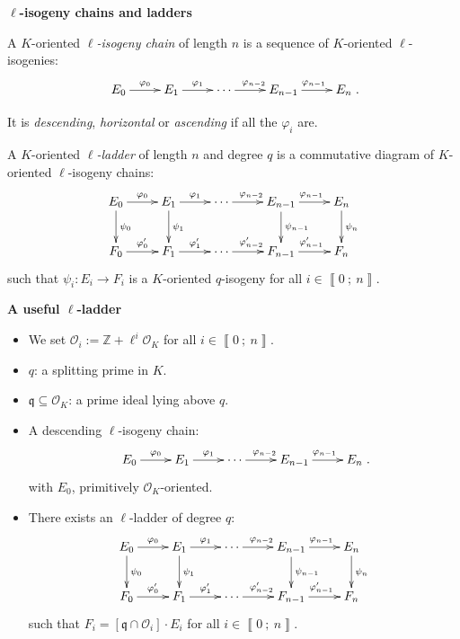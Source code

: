 \documentclass[10pt]{beamer}
\theoremstyle{plain}
\theoremstyle{definition}
\newcommand{\Z}{\mathbb{Z}}
\newcommand{\mO}{\mathcal{O}}
\renewcommand{\i}[2]{\left\llbracket #1~;~#2\right\rrbracket}
\renewcommand{\(}{\left(}
\renewcommand{\)}{\right)}
\newcommand{\mf}[1]{\mathfrak{#1}}
\begin{document}
\begin{frame}

\textbf{$\ell$-isogeny chains and ladders}

\begin{definition}
A $K$-oriented \emph{$\ell$-isogeny chain} of length $n$ is a sequence of $K$-oriented $\ell$-isogenies:
\[\xymatrix{
E_0 \ar[r]^{\varphi_0} & E_1 \ar[r]^{\varphi_{1}}& \cdots \ar[r]^{\varphi_{n-2}} & E_{n-1} \ar[r]^{\varphi_{n-1}} & E_n
}.\]

It is \emph{descending}, \emph{horizontal} or \emph{ascending} if all the $\varphi_i$ are.

\pause

A $K$-oriented \emph{$\ell$-ladder} of length $n$ and degree $q$ is a commutative diagram of $K$-oriented $\ell$-isogeny chains:
\[\xymatrix{
E_0 \ar[d]^{\psi_0} \ar[r]^{\varphi_0} & E_1\ar[d]^{\psi_1} \ar[r]^{\varphi_{1}}& \cdots \ar[r]^{\varphi_{n-2}} & E_{n-1} \ar[d]^{\psi_{n-1}} \ar[r]^{\varphi_{n-1}} & E_n \ar[d]^{\psi_n}\\
F_0 \ar[r]^{\varphi'_0} & F_1 \ar[r]^{\varphi'_{1}}& \cdots \ar[r]^{\varphi'_{n-2}} & F_{n-1} \ar[r]^{\varphi'_{n-1}} & F_n
}\]
such that $\psi_i : E_i\longrightarrow F_i$ is a $K$-oriented $q$-isogeny for all $i\in\i{0}{n}$.
\end{definition}

\end{frame}

\begin{frame}
\textbf{A useful $\ell$-ladder}

\vspace{0.5cm}

\begin{itemize}
\item We set $\mO_i:=\Z+\ell^i\mO_K$ for all $i\in\i{0}{n}$.
\item $q$: a splitting prime in $K$.
\item $\mf{q}\subseteq \mO_K$: a prime ideal lying above $q$. 
\item A descending $\ell$-isogeny chain:
\[\xymatrix{
E_0 \ar[r]^{\varphi_0} & E_1 \ar[r]^{\varphi_{1}}& \cdots \ar[r]^{\varphi_{n-2}} & E_{n-1} \ar[r]^{\varphi_{n-1}} & E_n
}.\]
with $E_0$, primitively $\mO_K$-oriented.
\item There exists an $\ell$-ladder of degree $q$:
\[\xymatrix{
E_0 \ar[d]^{\psi_0} \ar[r]^{\varphi_0} & E_1\ar[d]^{\psi_1} \ar[r]^{\varphi_{1}}& \cdots \ar[r]^{\varphi_{n-2}} & E_{n-1} \ar[d]^{\psi_{n-1}} \ar[r]^{\varphi_{n-1}} & E_n \ar[d]^{\psi_n}\\
F_0 \ar[r]^{\varphi'_0} & F_1 \ar[r]^{\varphi'_{1}}& \cdots \ar[r]^{\varphi'_{n-2}} & F_{n-1} \ar[r]^{\varphi'_{n-1}} & F_n
}\]
such that $F_i=[\mf{q}\cap\mO_i]\cdot E_i$ for all $i\in\i{0}{n}$.
\end{itemize}

\end{frame}
\end{document}
